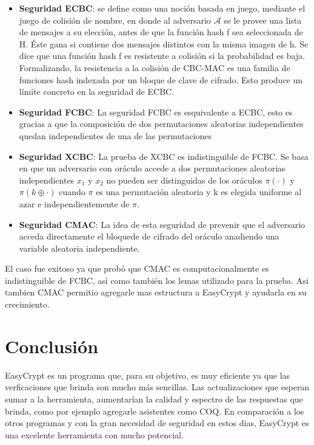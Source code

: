 \documentclass[runningheads,a4paper]{llncs}
\begin{document}
\begin{itemize}
	\item \textbf{Seguridad ECBC}: se define como una noción basada en juego, mediante el juego de colisión de nombre, en donde al adversario $\mathcal{A}$ se le provee una lista de mensajes a su elección, antes de que la función hash f sea seleccionada de H. Éste gana si contiene dos mensajes distintos con la misma imagen de h. Se dice que una función hash f es resistente a colisión si la probabilidad es baja. Formalizando, la resistencia a la colisión de CBC-MAC es una familia de funciones hash indexada por un bloque de clave de cifrado. Esto produce un límite concreto en la seguridad de ECBC.
	\item \textbf{Seguridad FCBC}: La seguridad FCBC es esquivalente a ECBC, esto es gracias a que la composición de dos permutaciones aleatorias independientes quedan independientes de una de las permutaciones 
	\item \textbf{Seguridad XCBC}: La prueba de XCBC es indistinguible de FCBC. Se basa en que un adversario con oráculo accede a dos permutaciones aleatorias independientes $x_1$ y $x_2$ no pueden ser distinguidas de los oráculos $\pi (\cdot)$ y $\pi (k \oplus \cdot)$ cuando $\pi$ es una permutación aleatoria y k es elegida uniforme al azar e independientemente de $\pi$.
	\item \textbf{Seguridad CMAC}: La idea de esta seguridad de prevenir que el adversario acceda directamente el bloquede de cifrado del oráculo anadiendo una variable aleatoria independiente.
\end{itemize}
El caso fue exitoso ya que probó que CMAC es computacionalmente es indistinguible de FCBC, así como también los lemas utilizado para la prueba. Asi tambien CMAC permitio agregarle mas estructura a EasyCrypt y ayudarla en su crecimiento.\cite{article5}

\section{Conclusión}


EasyCrypt es un programa que, para su objetivo, es muy eficiente ya que las verficaciones que brinda son mucho más sencillas. Las actualizaciones que esperan sumar a la herramienta, aumentarían la calidad y espectro de las respuestas que brinda, como por ejemplo agregarle asistentes como COQ. En comparación a los otros programas y con la gran necesidad de seguridad en estos dias, EasyCrypt es una excelente herramienta con mucho potencial.
\end{document}
